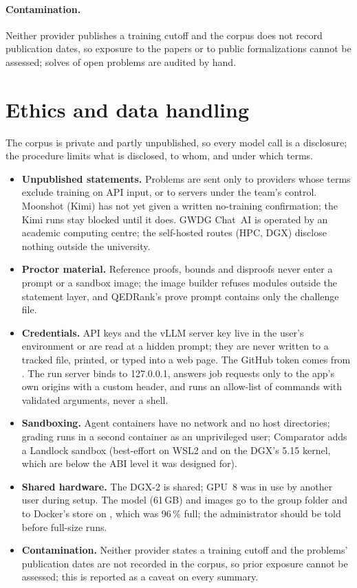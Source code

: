 \documentclass[11pt,a4paper]{article}
\begin{document}
\paragraph{Contamination.} Neither provider publishes a training cutoff and the corpus does not record publication dates, so exposure to the papers or to public formalizations cannot be assessed; solves of open problems are audited by hand.

\section{Ethics and data handling}

The corpus is private and partly unpublished, so every model call is a disclosure; the procedure limits what is disclosed, to whom, and under which terms.
\begin{itemize}
\item \textbf{Unpublished statements.} Problems are sent only to providers whose terms exclude training on API input, or to servers under the team's control. Moonshot (Kimi) has not yet given a written no-training confirmation; the Kimi runs stay blocked until it does. GWDG Chat~AI is operated by an academic computing centre; the self-hosted routes (HPC, DGX) disclose nothing outside the university.
\item \textbf{Proctor material.} Reference proofs, bounds and disproofs never enter a prompt or a sandbox image; the image builder refuses modules outside the statement layer, and QEDRank's prove prompt contains only the challenge file.
\item \textbf{Credentials.} API keys and the vLLM server key live in the user's environment or are read at a hidden prompt; they are never written to a tracked file, printed, or typed into a web page. The GitHub token comes from . The run server binds to 127.0.0.1, answers job requests only to the app's own origins with a custom header, and runs an allow-list of commands with validated arguments, never a shell.
\item \textbf{Sandboxing.} Agent containers have no network and no host directories; grading runs in a second container as an unprivileged user; Comparator adds a Landlock sandbox (best-effort on WSL2 and on the DGX's 5.15 kernel, which are below the ABI level it was designed for).
\item \textbf{Shared hardware.} The DGX-2 is shared; GPU~8 was in use by another user during setup. The model (61\,GB) and images go to the group folder  and to Docker's store on , which was 96\,\% full; the administrator should be told before full-size runs.
\item \textbf{Contamination.} Neither provider states a training cutoff and the problems' publication dates are not recorded in the corpus, so prior exposure cannot be assessed; this is reported as a caveat on every summary.
\end{itemize}
\end{document}
